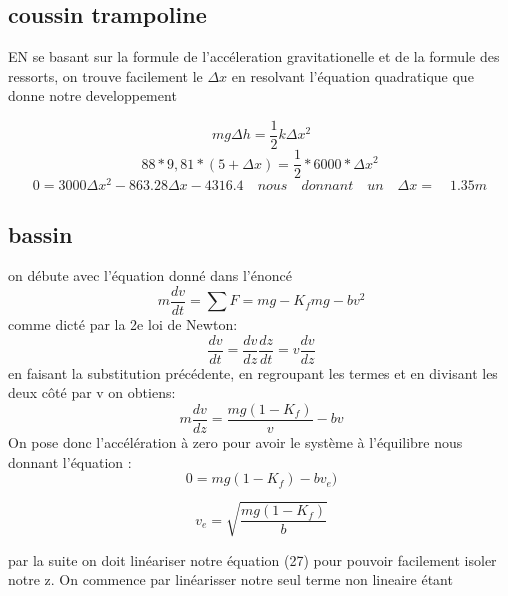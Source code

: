 \documentclass{article}
\begin{document}
 
 \subsection{coussin trampoline}
 
 EN se basant sur la formule de l'accéleration gravitationelle et de la formule des ressorts, on trouve facilement le $\Delta x$ en resolvant l'équation quadratique que donne notre developpement
 
 \begin{equation}
\ mg \Delta h = \frac{1}{2}k \Delta x ^2
 \end{equation}
 \begin{equation}
 88*9,81*(5+\Delta x) = \frac{1}{2}*6000*\Delta x^2 
 \end{equation}
 \begin{equation}
 0 = 3000\Delta x^2 - 863.28 \Delta x - 4316.4 \quad nous\quad  donnant\quad  un\quad  \Delta x=\quad 1.35m 
 \end{equation}

\subsection{bassin}

on débute avec l'équation donné dans l'énoncé
\begin{equation}
\ m \frac{dv}{dt} = \sum F = mg - K_{f}mg - bv^2
\end{equation}
comme dicté par la 2e loi de Newton:
\begin{equation}
\ \frac{dv}{dt} = \frac{dv}{dz} \frac{dz}{dt} = v\frac{dv}{dz}
\end{equation}
en faisant la substitution précédente, en regroupant les termes et en divisant les deux côté par v on obtiens:
\begin{equation}
\ m\frac{dv}{dz} =  \frac{mg ( 1- K_{f})}{v} - bv
\end{equation}
On pose donc l'accélération à zero pour avoir le système à l'équilibre nous donnant l'équation :
\begin{equation}
\ 0 =  mg ( 1- K_{f}) - bv_{e})
\end{equation}

\begin{equation}
\ v_{e} = \sqrt{\frac{mg(1-K_{f})}{b}}
\end{equation}

par la suite on doit linéariser notre équation (27) pour pouvoir facilement isoler notre z. On commence par linéarisser notre seul terme non lineaire étant 
\end{document}
